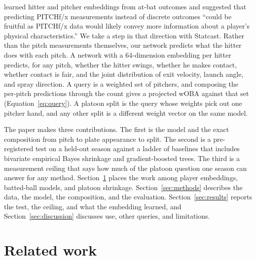 \documentclass[11pt,letterpaper]{article}
\begin{document}
\citet{alcorn2018} learned hitter and pitcher embeddings from at-bat outcomes and suggested that predicting PITCHf/x measurements instead of discrete outcomes ``could be fruitful as PITCHf/x data would likely convey more information about a player's physical characteristics.'' We take a step in that direction with Statcast. Rather than the pitch measurements themselves, our network predicts what the hitter does with each pitch. A network with a 64-dimension embedding per hitter predicts, for any pitch, whether the hitter swings, whether he makes contact, whether contact is fair, and the joint distribution of exit velocity, launch angle, and spray direction. A query is a weighted set of pitchers, and composing the per-pitch predictions through the count gives a projected wOBA against that set (Equation~\ref{eq:query}). A platoon split is the query whose weights pick out one pitcher hand, and any other split is a different weight vector on the same model.

The paper makes three contributions. The first is the model and the exact composition from pitch to plate appearance to split. The second is a pre-registered test on a held-out season against a ladder of baselines that includes bivariate empirical Bayes shrinkage and gradient-boosted trees. The third is a measurement ceiling that says how much of the platoon question one season can answer for any method. Section~\ref{sec:related} places the work among player embeddings, batted-ball models, and platoon shrinkage. Section~\ref{sec:methods} describes the data, the model, the composition, and the evaluation. Section~\ref{sec:results} reports the test, the ceiling, and what the embedding learned, and Section~\ref{sec:discussion} discusses use, other queries, and limitations.

\section{Related work}
\label{sec:related}

\end{document}

